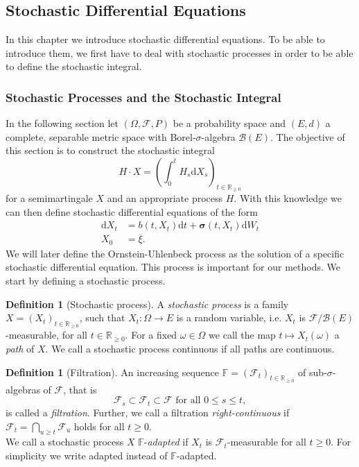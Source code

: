 \documentclass[11pt,titlepage]{article}
\newcommand{\R}{\mathbb{R}} %
\theoremstyle{definition}
\newtheorem{definition}[theorem]{Definition}
\theoremstyle{remark}
\begin{document}
	\newpage
	
	\subsection{Stochastic Differential Equations}
	
	In this chapter we introduce stochastic differential equations. To be able to introduce them, we first have to deal with stochastic processes in order to be able to define the stochastic integral.
	
	\subsubsection{Stochastic Processes and the Stochastic Integral}
	
	In the following section let $(\Omega, \mathcal{F}, P)$ be a probability space and $(E, d)$ a complete, separable metric space with 
	Borel-$\sigma$-algebra $\mathcal{B}(E)$. The objective of this section is to construct the stochastic integral 
	\[H\cdot X = \left(\int_0^t H_s \mathrm{d}X_s\right)_{t\in\R_{\geq 0}}\]
	for a semimartingale $X$ and an appropriate process $H$. With this knowledge we can then define stochastic differential equations of the form
	\begin{align*}
		\mathrm{d}X_t &= b(t, X_t)\mathrm{d}t + \boldsymbol{\sigma}(t, X_t)\mathrm{d}W_t \\
		X_0 &= \xi.
	\end{align*}
	We will later define the Ornstein-Uhlenbeck process as the solution of a specific stochastic 
	differential equation. This process is important for our methods. We start by defining a stochastic process.
	
	\begin{definition}[Stochastic process]
		A \textsl{stochastic process} is a family $X = (X_t)_{t\in\R_{\geq 0}}$, such that $X_t:\Omega\to E$ is a random variable, i.e. $X_t$ is $\mathcal{F}/\mathcal{B}(E)$-measurable, for all $t\in\R_{\geq 0}$. For a fixed
		$\omega\in\Omega$ we call the map $t\mapsto X_t(\omega)$ a \textsl{path} of $X$. 
		We call a stochastic process continuous if all paths are continuous.
	\end{definition}

	\begin{definition}[Filtration]
		An increasing sequence $\mathbb{F}=(\mathcal{F}_t)_{t\in\R_{\geq 0}}$ of sub-$\sigma$-algebras 
		of $\mathcal{F}$, that is
		\[\mathcal{F}_s\subset\mathcal{F}_t\subset\mathcal{F}\text{ for all } 0\leq s\leq t,\]
		is called a \textsl{filtration}. 
		Further, we call a filtration \textsl{right-continuous} if $\mathcal{F}_t = \bigcap_{u\geq t}\mathcal{F}_u$ holds for all $t\geq 0$. \\
		We call a stochastic process $X$ $\mathbb{F}$-\textsl{adapted} if $X_t$ is $\mathcal{F}_t$-measurable for all $t\geq 0$. For simplicity we write adapted instead of $\mathbb{F}$-adapted.
	\end{definition}
	
\end{document}

